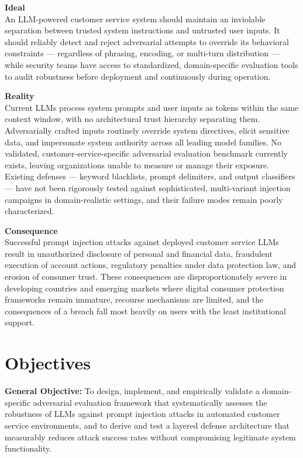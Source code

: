 \documentclass[12pt,a4paper]{article}
\begin{document}

\textbf{Ideal}\\
An LLM-powered customer service system should maintain an inviolable separation between trusted system instructions and untrusted user inputs. It should reliably detect and reject adversarial attempts to override its behavioral constraints — regardless of phrasing, encoding, or multi-turn distribution — while security teams have access to standardized, domain-specific evaluation tools to audit robustness before deployment and continuously during operation.

\textbf{Reality}\\
Current LLMs process system prompts and user inputs as tokens within the same context window, with no architectural trust hierarchy separating them. Adversarially crafted inputs routinely override system directives, elicit sensitive data, and impersonate system authority across all leading model families. No validated, customer-service-specific adversarial evaluation benchmark currently exists, leaving organizations unable to measure or manage their exposure. Existing defenses — keyword blacklists, prompt delimiters, and output classifiers — have not been rigorously tested against sophisticated, multi-variant injection campaigns in domain-realistic settings, and their failure modes remain poorly characterized.

\textbf{Consequence}\\
Successful prompt injection attacks against deployed customer service LLMs result in unauthorized disclosure of personal and financial data, fraudulent execution of account actions, regulatory penalties under data protection law, and erosion of consumer trust. These consequences are disproportionately severe in developing countries and emerging markets where digital consumer protection frameworks remain immature, recourse mechanisms are limited, and the consequences of a breach fall most heavily on users with the least institutional support.

\section{Objectives}

\textbf{General Objective:} To design, implement, and empirically validate a domain-specific adversarial evaluation framework that systematically assesses the robustness of LLMs against prompt injection attacks in automated customer service environments, and to derive and test a layered defense architecture that measurably reduces attack success rates without compromising legitimate system functionality.
\end{document}
